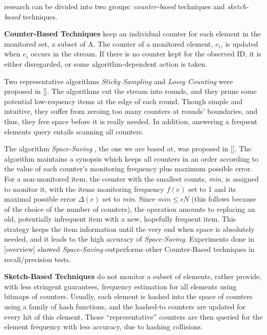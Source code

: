\documentclass[conference]{IEEEtran}
\begin{document}
research can be divided into two groups: \emph{counter-based} techniques and \emph{sketch-based} techniques.\par

\textbf{Counter-Based Techniques} keep an individual counter for each element in the monitored set, a subset of A. The counter of a monitored element, $e_i$, is updated when $e_i$ occurs in the stream. If there is no counter kept for the observed ID, it is either disregarded, or some algorithm-dependent action is taken.\par

Two representative algorithms \emph{Sticky Sampling} and \emph{Lossy Counting} were proposed in []. The algorithms cut the stream into rounds, and they prune some potential low-requency items at the edge of each round. Though simple and intuitive, they suffer from zeroing too many counters at rounds’ boundaries, and thus, they free space before it is really needed. In addition, answering a frequent elements query entails scanning all counters.\par

The algorithm \emph{Space-Saving} , the one we are based at, was proposed in []. The algorithm maintains a synopsis which keeps all counters in an order according to the value of each counter's monitoring frequency plus maximum possible error. For a non-monitored item, the counter with the smallest counts, \emph{min}, is assigned to monitor it, with the items monitoring frequency $f(e)$ set to 1 and its maximal possible error $\Delta(e)$ set to \emph{min}. Since $min\leq\epsilon N$ (this follows because of the choice of the number of counters), the operation amounts to replacing an old, potentially infrequent item with a new, hopefully frequent item. This strategy keeps the item information until the very end when space is absolutely needed, and it leads to the high accuracy of \emph{Space-Saving}. Experiments done in [overview] showed \emph{Space-Saving} outperforms other Counter-Based techniques in recall/precision tests.\par

\textbf{Sketch-Based Techniques} do not monitor a subset of elements, rather provide, with less stringent guarantees, frequency estimation for all elements using bitmaps of counters. Usually, each element is hashed into the space of counters using a family of hash functions, and the hashed-to counters are updated for every hit of this element. Those “representative” counters are then queried for the element frequency with less accuracy, due to hashing collisions.\par
\end{document}
